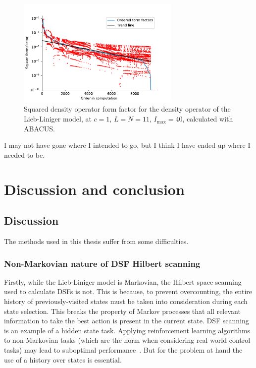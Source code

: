 \documentclass[11pt, a4paper]{report} %
\begin{document}
\begin{figure}[tb!]
  \centering
  \includegraphics[width=0.7\textwidth]{abacus_ff_sq.pdf}
  \caption{Squared density operator form factor for the density operator of the Lieb-Liniger model, at \(c=1\), \(L=N=11\), \(I_{\max}=40\), calculated with ABACUS.}\label{fig:abacusformfactors}
\end{figure}







\begin{savequote}[50mm]
I may not have gone where I intended to go, but I think I have ended up where I needed to be.
\end{savequote}



\chapter{Discussion and conclusion}\label{chap:conclusion}


\section{Discussion}

The methods used in this thesis suffer from some difficulties.

\subsection{Non-Markovian nature of DSF Hilbert scanning}

Firstly, while the Lieb-Liniger model is Markovian, the Hilbert space scanning used to calculate DSFs is not.
This is because, to prevent overcounting, the entire history of previously-visited states must be taken into consideration during each state selection.
This breaks the property of Markov processes that all relevant information to take the best action is present in the current state.
DSF scanning is an example of a hidden state task.
Applying reinforcement learning algorithms to non-Markovian tasks (which are the norm when considering real world control tasks) may lead to suboptimal performance~\cite{whitehead95_reinf_learn_non_markov_decis_proces}.
But for the problem at hand the use of a history over states is essential.
\end{document}
